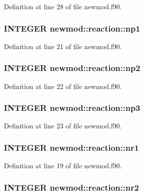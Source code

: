 Definition at line 28 of file newmod.f90.\hypertarget{typenewmod_1_1reaction_aaec132a5117781a88da739220d97244a}{
\subsubsection[{np1}]{\setlength{\rightskip}{0pt plus 5cm}INTEGER {\bf newmod::reaction::np1}}}
\label{typenewmod_1_1reaction_aaec132a5117781a88da739220d97244a}


Definition at line 21 of file newmod.f90.\hypertarget{typenewmod_1_1reaction_aee39c50349fa2f015429286a4d1bc437}{
\subsubsection[{np2}]{\setlength{\rightskip}{0pt plus 5cm}INTEGER {\bf newmod::reaction::np2}}}
\label{typenewmod_1_1reaction_aee39c50349fa2f015429286a4d1bc437}


Definition at line 22 of file newmod.f90.\hypertarget{typenewmod_1_1reaction_a040ce2d4197a70cff80b26261b7fa961}{
\subsubsection[{np3}]{\setlength{\rightskip}{0pt plus 5cm}INTEGER {\bf newmod::reaction::np3}}}
\label{typenewmod_1_1reaction_a040ce2d4197a70cff80b26261b7fa961}


Definition at line 23 of file newmod.f90.\hypertarget{typenewmod_1_1reaction_a773aabf6f76e2e7b82d2418fc3990ec7}{
\subsubsection[{nr1}]{\setlength{\rightskip}{0pt plus 5cm}INTEGER {\bf newmod::reaction::nr1}}}
\label{typenewmod_1_1reaction_a773aabf6f76e2e7b82d2418fc3990ec7}


Definition at line 19 of file newmod.f90.\hypertarget{typenewmod_1_1reaction_ae1e0feaf798a9ca8b8fd2e1b7ab20457}{
\subsubsection[{nr2}]{\setlength{\rightskip}{0pt plus 5cm}INTEGER {\bf newmod::reaction::nr2}}}
\label{typenewmod_1_1reaction_ae1e0feaf798a9ca8b8fd2e1b7ab20457}


